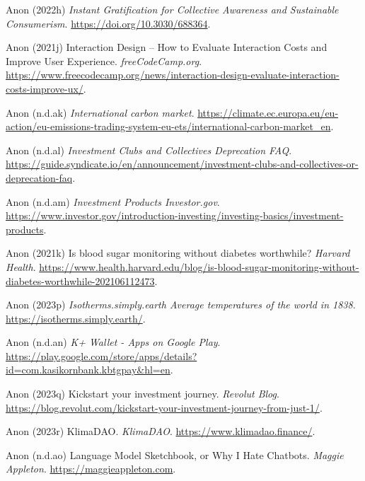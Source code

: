 \documentclass[
  letterpaper,
  DIV=11,
  numbers=noendperiod]{scrartcl}
\newlength{\cslhangindent}
\newenvironment{CSLReferences}[2] %
 {\begin{list}{}{%
  \setlength{\itemindent}{0pt}
  \setlength{\leftmargin}{0pt}
  \setlength{\parsep}{0pt}
  \ifodd #1
   \setlength{\leftmargin}{\cslhangindent}
   \setlength{\itemindent}{-1\cslhangindent}
  \fi
  \setlength{\itemsep}{#2\baselineskip}}}
 {\end{list}}
\begin{document}
\begin{CSLReferences}{0}{1}
Anon (2022h) \emph{Instant {Gratification} for {Collective Awareness}
and {Sustainable Consumerism}}. \url{https://doi.org/10.3030/688364}.

Anon (2021j) Interaction {Design} -- {How} to {Evaluate Interaction
Costs} and {Improve User Experience}. \emph{freeCodeCamp.org}.
\url{https://www.freecodecamp.org/news/interaction-design-evaluate-interaction-costs-improve-ux/}.

Anon (n.d.ak) \emph{International carbon market}.
\url{https://climate.ec.europa.eu/eu-action/eu-emissions-trading-system-eu-ets/international-carbon-market_en}.

Anon (n.d.al) \emph{Investment {Clubs} and {Collectives} {\textbar}
{Deprecation FAQ}}.
\url{https://guide.syndicate.io/en/announcement/investment-clubs-and-collectives-or-deprecation-faq}.

Anon (n.d.am) \emph{Investment {Products} {\textbar} {Investor}.gov}.
\url{https://www.investor.gov/introduction-investing/investing-basics/investment-products}.

Anon (2021k) Is blood sugar monitoring without diabetes worthwhile?
\emph{Harvard Health}.
\url{https://www.health.harvard.edu/blog/is-blood-sugar-monitoring-without-diabetes-worthwhile-202106112473}.

Anon (2023p) \emph{Isotherms.simply.earth {\textbar} {Average}
temperatures of the world in 1838}.
\url{https://isotherms.simply.earth/}.

Anon (n.d.an) \emph{K+ {Wallet} - {Apps} on {Google Play}}.
\url{https://play.google.com/store/apps/details?id=com.kasikornbank.kbtgpay&hl=en}.

Anon (2023q) Kickstart your investment journey. \emph{Revolut Blog}.
\url{https://blog.revolut.com/kickstart-your-investment-journey-from-just-1/}.

Anon (2023r) {KlimaDAO}. \emph{KlimaDAO}.
\url{https://www.klimadao.finance/}.

Anon (n.d.ao) Language {Model Sketchbook}, or {Why I Hate Chatbots}.
\emph{Maggie Appleton}. \url{https://maggieappleton.com}.


\end{CSLReferences}
\end{document}
